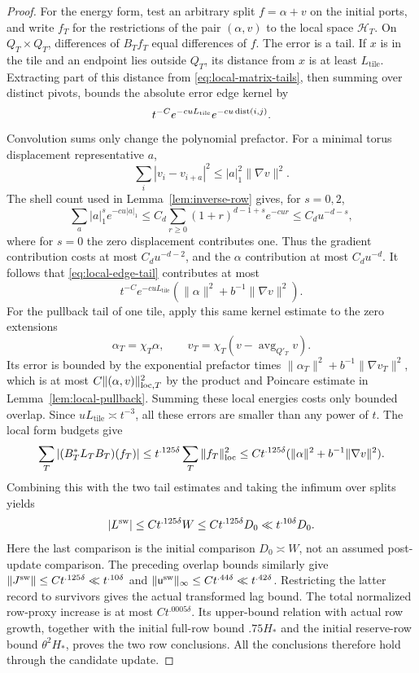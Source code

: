 \begin{proof}
For the energy form, test an arbitrary split \(f=\alpha+v\) on the
initial ports, and write \(f_T\) for the restrictions of the pair
\((\alpha,v)\) to the local space \(\mathcal H_T\).
On \(Q_T\times Q_T\), differences of \(B_Tf_T\) equal
differences of \(f\).  The error is a tail.  If \(x\) is in the tile
and an endpoint lies outside \(Q_T\), its distance from \(x\) is at
least \(L_{\mathrm{tile}}\).  Extracting part of this distance from
\eqref{eq:local-matrix-tails}, then summing over distinct pivots,
bounds the absolute error edge kernel by
\begin{equation}\label{eq:local-edge-tail}
 t^{-C}e^{-cuL_{\mathrm{tile}}}e^{-cu\operatorname{dist}(i,j)}.
\end{equation}
Convolution sums only change the polynomial prefactor.
For a minimal torus displacement representative \(a\),
\[
 \sum_i|v_i-v_{i+a}|^2\le |a|_1^2\|\nabla v\|^2.
\]
The shell count used in Lemma~\ref{lem:inverse-row} gives, for
\(s=0,2\),
\[
 \sum_a |a|_1^s e^{-cu|a|_1}
 \le C_d\sum_{r\ge0}(1+r)^{d-1+s}e^{-cur}
 \le C_d u^{-d-s},
\]
where for \(s=0\) the zero displacement contributes one.  Thus
the gradient contribution costs at most \(C_du^{-d-2}\), and the
\(\alpha\) contribution at most \(C_du^{-d}\).
It follows that \eqref{eq:local-edge-tail} contributes at most
\[
 t^{-C}e^{-cuL_{\mathrm{tile}}}
       (\|\alpha\|^2+b^{-1}\|\nabla v\|^2).
\]
For the pullback tail of one tile, apply this same kernel estimate to
the zero extensions
\[
 \alpha_T=\chi_T\alpha,\qquad
 v_T=\chi_T(v-\operatorname{avg}_{Q'_T}v).
\]
Its error is bounded by the exponential prefactor times
\(\|\alpha_T\|^2+b^{-1}\|\nabla v_T\|^2\), which is at most
\(C\| (\alpha,v)\|_{{\rm loc},T}^2\) by the product and Poincare
estimate in Lemma~\ref{lem:local-pullback}.  Summing these local
energies costs only bounded overlap.  Since
\(uL_{\mathrm{tile}}\asymp t^{-3}\), all these errors are smaller than
any power of \(t\).  The local form budgets give
\[
 \sum_T |(B_T^*L_TB_T)(f_T)|
 \le t^{.125\delta}\sum_T\|f_T\|_{\rm loc}^2
 \le Ct^{.125\delta}
       (\|\alpha\|^2+b^{-1}\|\nabla v\|^2).
\]
Combining this with the two tail estimates and taking the infimum over
splits yields
\[
 |L^{\rm sw}|\le Ct^{.125\delta}W
       \le Ct^{.125\delta}D_0\ll t^{.10\delta}D_0.
\]
Here the last comparison is the initial comparison
\(D_0\asymp W\), not an assumed post-update comparison.
The preceding overlap bounds similarly give
\(\|J^{\rm sw}\|\le Ct^{.125\delta}\ll t^{.10\delta}\) and
\(\|\mathsf u^{\rm sw}\|_\infty\le Ct^{.44\delta}\ll t^{.42\delta}\).
Restricting the latter record to survivors gives the actual transformed
lag bound.  The total normalized row-proxy increase is at most
\(Ct^{.0005\delta}\).  Its upper-bound relation with actual row growth,
together with the initial full-row bound \(.75H_*\) and the initial
reserve-row bound \(\theta^2H_*\), proves the two row conclusions.
All the conclusions therefore hold through the candidate update.
\end{proof}

